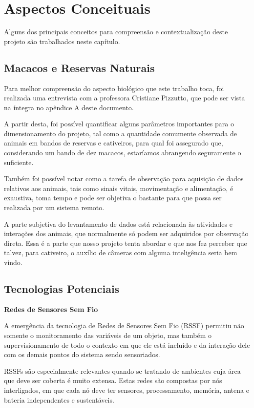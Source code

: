 \chapter{Aspectos Conceituais}
Alguns dos principais conceitos para compreensão e contextualização deste projeto são trabalhados neste capítulo.

\section{Macacos e Reservas Naturais}
Para melhor compreensão do aspecto biológico que este trabalho toca, foi realizada uma entrevista com a professora Cristiane Pizzutto, que pode ser vista na íntegra no apêndice A deste documento.

A partir desta, foi possível quantificar alguns parâmetros importantes para o dimensionamento do projeto, tal como a quantidade comumente observada de animais em bandos de reservas e cativeiros, para qual foi assegurado que, considerando um bando de dez macacos, estaríamos abrangendo seguramente o suficiente.

Também foi possível notar como a tarefa de observação para aquisição de dados relativos aos animais, tais como sinais vitais, movimentação e alimentação, é exaustiva, toma tempo e pode ser objetiva o bastante para que possa ser realizada por um sistema remoto.

A parte subjetiva do levantamento de dados está relacionada às atividades e interações dos animais, que normalmente só podem ser adquiridos por observação direta. Essa é a parte que nosso projeto tenta abordar e que nos fez perceber que talvez, para cativeiro, o auxílio de câmeras com alguma inteligência seria bem vindo.

\section{Tecnologias Potenciais}
\textbf{Redes de Sensores Sem Fio}

A emergência da tecnologia de Redes de Sensores Sem Fio (RSSF) permitiu não somente o monitoramento das variáveis de um objeto, mas também o supervisionamento de todo o contexto em que ele está incluído e da interação dele com os demais pontos do sistema sendo sensoriados.

RSSFs são especialmente relevantes quando se tratando de ambientes cuja área que deve ser coberta é muito extensa. Estas redes são compostas por nós interligados, em que cada nó deve ter sensores, processamento, memória, antena e bateria independentes e sustentáveis.

